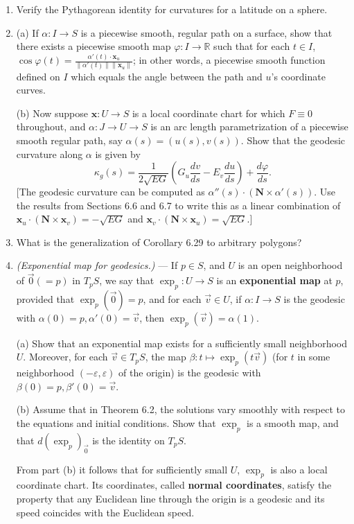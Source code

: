 \documentclass[leqno]{book}
\begin{document}
\begin{enumerate}
\item Verify the Pythagorean identity for curvatures for a latitude on a sphere.

\item (a) If $\alpha:I\to S$ is a piecewise smooth, regular path on a surface, show that there exists a piecewise smooth map $\varphi:I\to\mathbb R$ such that for each $t\in I$, $\cos\varphi(t)=\frac{\alpha'(t)\cdot\mathbf x_u}{\|\alpha'(t)\|\|\mathbf x_u\|}$; in other words, a piecewise smooth function defined on $I$ which equals the angle between the path and $u$'s coordinate curves.

(b) Now suppose $\mathbf x:U\to S$ is a local coordinate chart for which $F\equiv 0$ throughout, and $\alpha:J\to U\to S$ is an arc length parametrization of a piecewise smooth regular path, say $\alpha(s)=(u(s),v(s))$.  Show that the geodesic curvature along $\alpha$ is given by
$$\kappa_g(s)=\frac 1{2\sqrt{EG}}\left(G_u\frac{dv}{ds}-E_v\frac{du}{ds}\right)+\frac{d\varphi}{ds}.$$
[The geodesic curvature can be computed as $\alpha''(s)\cdot(\mathbf N\times\alpha'(s))$.  Use the results from Sections 6.6 and 6.7 to write this as a linear combination of $\mathbf x_u\cdot(\mathbf N\times\mathbf x_v)=-\sqrt{EG}$ and $\mathbf x_v\cdot(\mathbf N\times\mathbf x_u)=\sqrt{EG}$.]

\item What is the generalization of Corollary 6.29 to arbitrary polygons?

\item\emph{(Exponential map for geodesics.)} \---- If $p\in S$, and $U$ is an open neighborhood of $\vec 0(=p)$ in $T_pS$, we say that $\exp_p:U\to S$ is an \textbf{exponential map} at $p$, provided that $\exp_p(\vec 0)=p$, and for each $\vec v\in U$, if $\alpha:I\to S$ is the geodesic with $\alpha(0)=p,\alpha'(0)=\vec v$, then $\exp_p(\vec v)=\alpha(1)$.

(a) Show that an exponential map exists for a sufficiently small neighborhood $U$.  Moreover, for each $\vec v\in T_pS$, the map $\beta:t\mapsto\exp_p(t\vec v)$ (for $t$ in some neighborhood $(-\varepsilon,\varepsilon)$ of the origin) is the geodesic with $\beta(0)=p,\beta'(0)=\vec v$.

(b) Assume that in Theorem 6.2, the solutions vary smoothly with respect to the equations and initial conditions.  Show that $\exp_p$ is a smooth map, and that $d(\exp_p)_{\vec 0}$ is the identity on $T_pS$.

From part (b) it follows that for sufficiently small $U$, $\exp_p$ is also a local coordinate chart.  Its coordinates, called \textbf{normal coordinates}, satisfy the property that any Euclidean line through the origin is a geodesic and its speed coincides with the Euclidean speed.


\end{enumerate}
\end{document}

